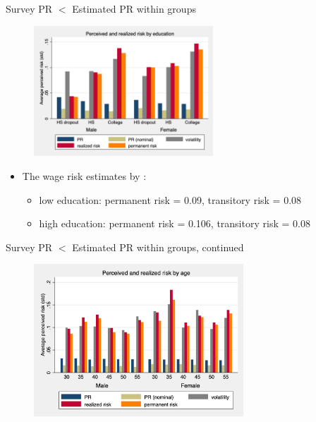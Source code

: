 \documentclass{beamer}
\begin{document}
\begin{frame}{Survey PR $<$ Estimated PR within groups}
	\label{observable_heterogeneity_by_educ}
	\begin{figure}[ht]
		\label{compare_by_gender_educ}
		\centering
		\includegraphics[width=0.60\textwidth]{figures/boxplot_rvar_compare_educ.png}
	\end{figure}
\pause 
	\begin{itemize}
		\item The wage risk estimates by  \cite{low2010wage}: 
		\begin{itemize}
			\item low education: permanent risk = 0.09, transitory risk = 0.08
			\item high education: permanent risk = 0.106, transitory risk = 0.08
	\end{itemize}
\end{itemize}
\end{frame}

\begin{frame}{Survey PR $<$ Estimated PR within groups, continued}
	\label{observable_heterogeneity_by_age}
	\begin{figure}[ht]
		\label{compare_by_gender_age}
		\centering
		\includegraphics[width=0.70\textwidth]{figures/boxplot_rvar_compare_age.png}
	\end{figure}
\end{frame}
\end{document}
